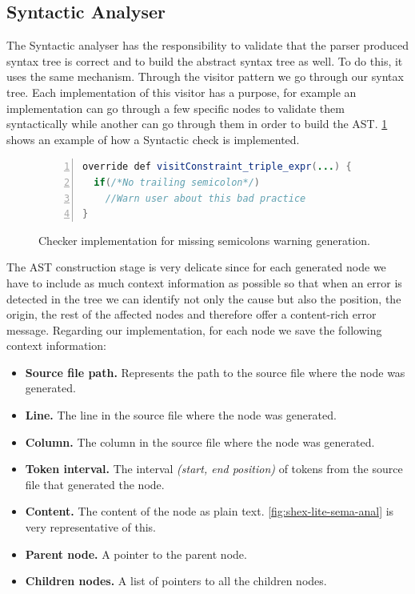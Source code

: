 \subsection{Syntactic Analyser}
The Syntactic analyser has the responsibility to validate that the parser produced syntax tree is correct and to build the abstract syntax
tree as well. To do this, it uses the same mechanism. Through the visitor pattern we go through our syntax tree. Each implementation
of this visitor has a purpose, for example an implementation can go through a few specific nodes to validate them syntactically
while another can go through them in order to build the AST. \cref{fig:checker-example} shows an example of how a Syntactic check is
implemented.

\begin{figure}
    \begin{lstlisting}[language=Java,numbers=left,basicstyle=\ttfamily\scriptsize]
override def visitConstraint_triple_expr(...) {
  if(/*No trailing semicolon*/)
    //Warn user about this bad practice
}
    \end{lstlisting}
    \caption[Checker implementation for missing semicolons warning generation]{Checker implementation for missing semicolons warning generation.}
    \label{fig:checker-example}
\end{figure}

The AST construction stage is very delicate since for each generated node we have to include as much context information as possible
so that when an error is detected in the tree we can identify not only the cause but also the position, the origin, the rest of the
affected nodes and therefore offer a content-rich error message. Regarding our implementation, for each node we save the following
context information:
\begin{itemize}
    \item \textbf{Source file path.} Represents the path to the source file where the node was generated.
    \item \textbf{Line.} The line in the source file where the node was generated.
    \item \textbf{Column.} The column in the source file where the node was generated.
    \item \textbf{Token interval.} The interval \textit{(start, end position)} of tokens from the source file that generated the node.
    \item \textbf{Content.} The content of the node as plain text. \cref{fig:shex-lite-sema-anal} is very representative of this. 
    \item \textbf{Parent node.} A pointer to the parent node.
    \item \textbf{Children nodes.} A list of pointers to all the children nodes.
\end{itemize}

